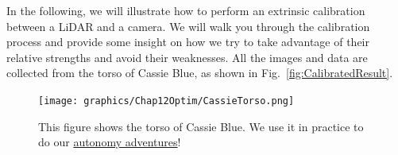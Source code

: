 In the following, we will illustrate how to perform an extrinsic calibration between a LiDAR and a camera. We will walk you through the calibration process and provide some insight on how we try to take advantage of their relative strengths and avoid their weaknesses. All the images and data are collected from the torso of Cassie Blue, as shown in Fig.~\ref{fig:CalibratedResult}.
\begin{figure}[hbt]%
    \centering
    \texttt{[image: graphics/Chap12Optim/CassieTorso.png]}
\caption[]{This figure shows the torso of Cassie Blue. We use it in practice to do our \href{https://youtu.be/uFyT8zCg1Kk}{autonomy adventures}!}
\label{fig:CassieTorso}%
\end{figure}







